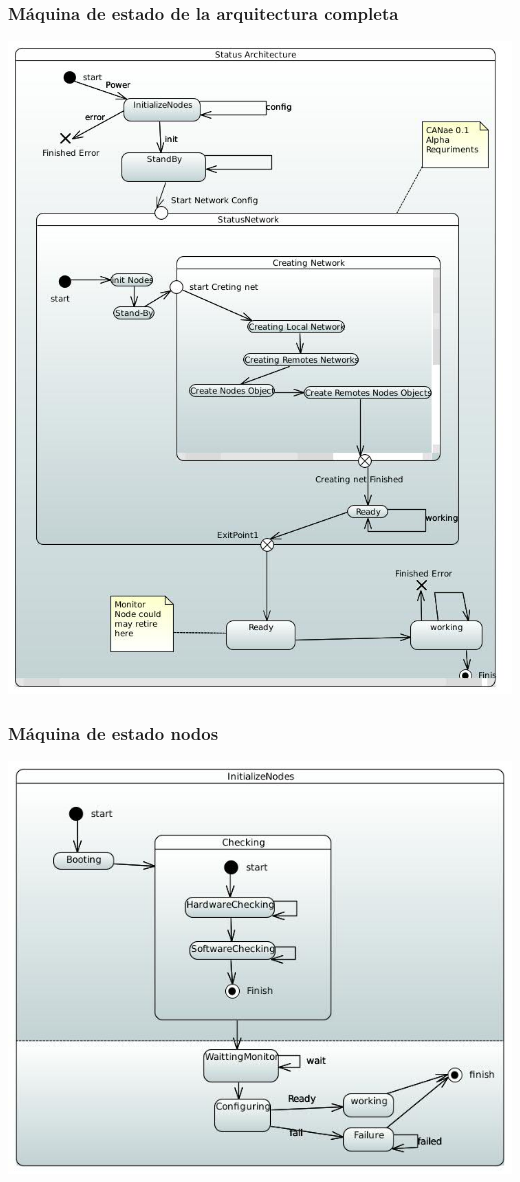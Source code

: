 \begin{frame}[c]
	\frametitle{Máquina de estado de la arquitectura completa}
	\centering
	\includegraphics[scale=0.25]{images/StateMachineArqCompleta.JPG}
\end{frame}

\begin{frame}[c]
	\frametitle{Máquina de estado nodos}
	\centering
	\includegraphics[scale=0.3]{images/InitializeNodes.JPG}
\end{frame}


